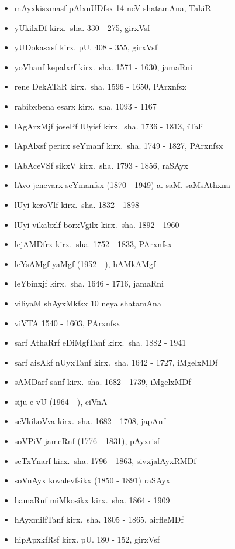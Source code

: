{\begin{itemize}
\item mAyxkisxmasf pAlxnUDfsx {\rm 14} neV shatamAna, TakiR
\item yUkilxDf kirx.~sha. {\rm 330 - 275}, girxVsf
\item yUDokasxsf kirx. pU. {\rm 408 - 355}, girxVsf
\item yoVhanf kepalxrf kirx.~sha. {\rm 1571 - 1630}, jamaRni
\item rene DekATaR kirx.~sha. {\rm 1596 - 1650}, PArxnfsx
\item rabibxbena esarx kirx.~sha. {\rm 1093 - 1167}
\item lAgArxMjf josePf lUyisf kirx.~sha. {\rm 1736 - 1813}, iTali
\item lApAlxsf perirx seYmanf kirx.~sha. {\rm 1749 - 1827}, PArxnfsx
\item lAbAceVSf sikxV kirx.~sha. {\rm 1793 - 1856}, raSAyx
\item lAvo jenevarx seYmanfsx {\rm (1870 - 1949)} a. saM. saMsAthxna
\item lUyi keroVlf kirx.~sha. {\rm 1832 - 1898}
\item lUyi vikabxlf borxVgilx kirx.~sha. {\rm 1892 - 1960}
\item lejAMDfrx kirx.~sha. {\rm 1752 - 1833}, PArxnfsx
\item leYsAMgf yaMgf {\rm (1952 - )}, hAMkAMgf 
\item leYbinxjf kirx.~sha. {\rm 1646 - 1716}, jamaRni
\item viliyaM shAyxMkfsx {\rm 10} neya shatamAna
\item viVTA {\rm 1540 - 1603}, PArxnfsx
\item sarf AthaRrf eDiMgfTanf kirx.~sha. {\rm 1882 - 1941}
\item sarf aisAkf nUyxTanf kirx.~sha. {\rm 1642 - 1727}, iMgelxMDf
\item sAMDarf sanf kirx.~sha. {\rm 1682 - 1739}, iMgelxMDf
\item siju e vU {\rm (1964 - )}, ciVnA
\item seVkikoVva kirx.~sha. {\rm 1682 - 1708}, japAnf
\item soVPiV jameRnf {\rm (1776 - 1831)}, pAyxrisf
\item seTxYnarf kirx.~sha. {\rm 1796 - 1863}, sivxjalAyxRMDf
\item soVnAyx kovalevfsikx {\rm (1850 - 1891)} raSAyx
\item hamaRnf miMkosikx kirx.~sha. {\rm 1864 - 1909}
\item hAyxmilfTanf kirx.~sha. {\rm 1805 - 1865}, airfleMDf
\item hipApxkfRsf kirx. pU. {\rm 180 - 152}, girxVsf

\end{itemize}}
